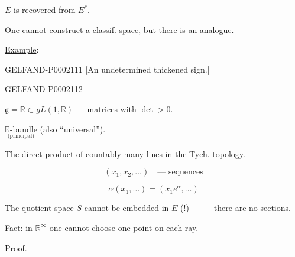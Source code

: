 $E$ is recovered from $E^*$.



One cannot construct a classif. space, but there is an analogue.



\underline{Example}:



\begin{GelfandAdjacentEvidence}{GELFAND-P000211}{1}
[An undetermined thickened sign.]
\end{GelfandAdjacentEvidence}
\begin{GelfandAdjacentEvidence}{GELFAND-P000211}{2}

$\mathfrak g=\mathbb R\subset gL (1,\mathbb R)$ --- matrices with $\det>0$.
\end{GelfandAdjacentEvidence}

 $\underset{\text{(principal)}}{\mathbb R\text{-bundle}}$ (also “universal”).



The direct product of countably many lines in the Tych. topology.



\begin{equation*}(x_1, x_2,\ldots)\quad\text{--- sequences}\end{equation*}



\begin{equation*}\alpha (x_1,\ldots)=(x_1e^\alpha,\ldots)\end{equation*}



The quotient space $S$ cannot be embedded in $E$ (!) ---
--- there are no sections.



\underline{Fact:} in $\mathbb R^\infty$ one cannot choose one point on each ray.



\underline{Proof.}



